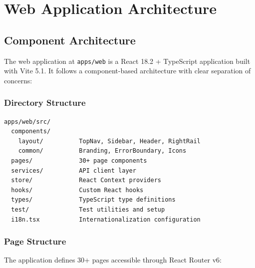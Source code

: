 \section{Web Application Architecture}

\subsection{Component Architecture}

The web application at \texttt{apps/web} is a React 18.2 + TypeScript application built with Vite 5.1. It follows a component-based architecture with clear separation of concerns:

\subsubsection{Directory Structure}

\begin{verbatim}
apps/web/src/
  components/
    layout/          TopNav, Sidebar, Header, RightRail
    common/          Branding, ErrorBoundary, Icons
  pages/             30+ page components
  services/          API client layer
  store/             React Context providers
  hooks/             Custom React hooks
  types/             TypeScript type definitions
  test/              Test utilities and setup
  i18n.tsx           Internationalization configuration
\end{verbatim}

\subsubsection{Page Structure}

The application defines 30+ pages accessible through React Router v6:

